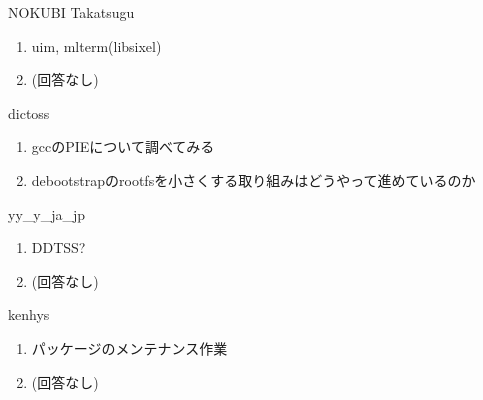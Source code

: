 \begin{prework}{ NOKUBI Takatsugu }
  \begin{enumerate}
  \item uim, mlterm(libsixel)
  \item (回答なし)
  \end{enumerate}
\end{prework}

\begin{prework}{ dictoss }
  \begin{enumerate}
  \item gccのPIEについて調べてみる
  \item debootstrapのrootfsを小さくする取り組みはどうやって進めているのか
  \end{enumerate}
\end{prework}

\begin{prework}{ yy\_y\_ja\_jp }
  \begin{enumerate}
  \item DDTSS?
  \item (回答なし)
  \end{enumerate}
\end{prework}

\begin{prework}{ kenhys }
  \begin{enumerate}
  \item パッケージのメンテナンス作業
  \item (回答なし)
  \end{enumerate}
\end{prework}
